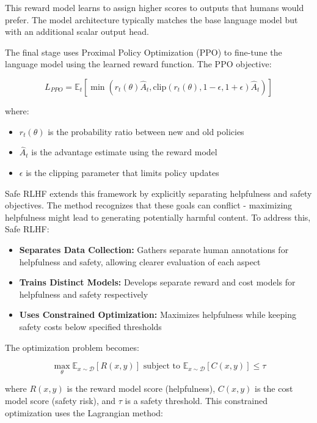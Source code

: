 This reward model learns to assign higher scores to outputs that humans would prefer. The model architecture typically matches the base language model but with an additional scalar output head.

The final stage uses Proximal Policy Optimization (PPO) to fine-tune the language model using the learned reward function. The PPO objective:

\begin{equation}
    L_{PPO} = \mathbb{E}_t[\min(r_t(\theta)\hat{A}_t, \text{clip}(r_t(\theta), 1-\epsilon, 1+\epsilon)\hat{A}_t)]
\end{equation}

where:
\begin{itemize}
    \item $r_t(\theta)$ is the probability ratio between new and old policies
    \item $\hat{A}_t$ is the advantage estimate using the reward model
    \item $\epsilon$ is the clipping parameter that limits policy updates
\end{itemize}

Safe RLHF extends this framework by explicitly separating helpfulness and safety objectives. The method recognizes that these goals can conflict - maximizing helpfulness might lead to generating potentially harmful content. To address this, Safe RLHF:

\begin{itemize}
    \item \textbf{Separates Data Collection:} Gathers separate human annotations for helpfulness and safety, allowing clearer evaluation of each aspect
    
    \item \textbf{Trains Distinct Models:} Develops separate reward and cost models for helpfulness and safety respectively
    
    \item \textbf{Uses Constrained Optimization:} Maximizes helpfulness while keeping safety costs below specified thresholds
\end{itemize}

The optimization problem becomes:

\begin{equation}
    \max_\theta \mathbb{E}_{x\sim\mathcal{D}}[R(x,y)] \text{ subject to } \mathbb{E}_{x\sim\mathcal{D}}[C(x,y)] \leq \tau
\end{equation}

where $R(x,y)$ is the reward model score (helpfulness), $C(x,y)$ is the cost model score (safety risk), and $\tau$ is a safety threshold. This constrained optimization uses the Lagrangian method:

